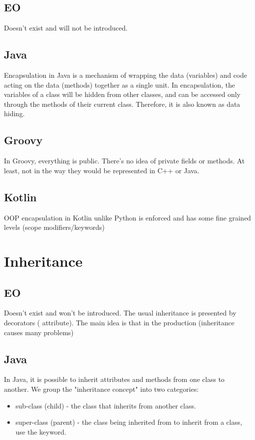 \documentclass[12pt]{book}
\begin{document}
{{\subsection{EO}
Doesn't exist and will not be introduced.

\subsection{Java}
Encapsulation in Java is a mechanism of wrapping  the data (variables) and code acting on the  data (methods) together as a single unit. In encapsulation, the variables of a class will be hidden from other classes, and can be accessed only through the methods of their current class.  Therefore, it is also known as data hiding.

\subsection{Groovy}
In Groovy, everything is public. There’s no idea  of private fields or methods. At least, not in the way they would be represented in C++ or Java.

\subsection{Kotlin}
OOP encapsulation in Kotlin unlike Python is enforced and has some fine grained levels (scope modifiers/keywords)

\section{Inheritance}

\subsection{EO}
Doesn't exist and won't be introduced. The usual inheritance is presented by decorators ( attribute). The main idea is that in the production (inheritance causes  many problems)

\subsection{Java}
In Java, it is possible to inherit attributes and methods from one class to another. We group the "inheritance concept" into two categories: 
\begin{itemize}
    \item sub-class (child) - the class that inherits from another class.
    \item super-class (parent) - the class being  inherited from to inherit from a class, use the  keyword.
\end{itemize}

}}
\end{document}
